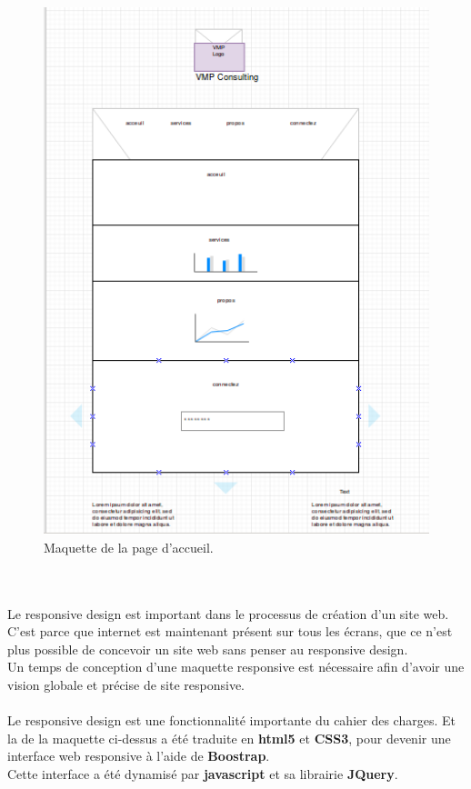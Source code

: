 \documentclass[12pt]{article}
\begin{document}
 \\
\\


\begin{center}
\begin{figure}[htp]
  \centering
  \includegraphics[width=12cm]{mod2.png}
  \caption{Maquette de la page d'accueil.}
  \label{fig:une-autre-image}
\end{figure}

\end{center}

\\ \\


Le responsive design est important dans le processus de création d’un site web.  C'est parce que internet est maintenant présent sur tous les écrans, que ce n'est plus possible de concevoir un site web sans penser au responsive design.\\
Un temps de conception d'une maquette responsive est nécessaire afin d'avoir une vision globale et précise de site responsive.\\ \\
Le responsive design est une fonctionnalité importante du cahier des charges.
Et la  de la maquette ci-dessus  a été traduite en \textbf{html5} et \textbf{CSS3}, pour devenir une  interface web responsive
 à l'aide de \textbf{Boostrap}.\\
Cette interface a été  dynamisé par \textbf{javascript} et sa librairie \textbf{JQuery}.
 
\end{document}
